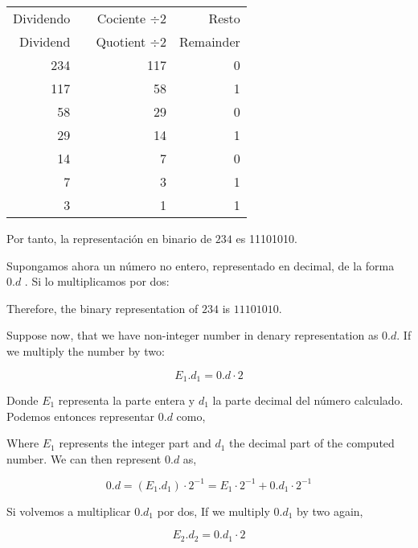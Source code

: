 \begin{table}[h]
	\centering
\begin{tabular}{|r|r|r|r|}
Dividendo& &Cociente $\div 2$&Resto\\
Dividend& &Quotient $\div 2$&Remainder\\
\hline
234& &117&0\\
117& &58&1\\
58& &29&0\\
29& &14&1\\
14& &7&0\\
7& &3&1\\
3& &1&1
\end{tabular}
\end{table}
 \begin{paracol}{2}
 Por tanto, la representación en binario de $234$ es 11101010.
 
Supongamos ahora un número no entero, representado en decimal, de la forma $0.d$ . Si lo multiplicamos por dos:

\switchcolumn

Therefore, the binary representation of $234$ is $11101010$.

 Suppose now, that we have non-integer number in denary representation as $0.d$. If we multiply the number by two:
\end{paracol}


\begin{equation}
E_1.d_1=0.d\cdot 2
\end{equation}
\begin{paracol}{2}
Donde $E_1$ representa la parte entera y $d_1$ la parte decimal del número calculado.
Podemos entonces representar $0.d$ como,

\switchcolumn

Where $E_1$ represents the integer part and $d_1$ the decimal part of the computed number. We can then represent $0.d$ as,
\end{paracol}
\begin{equation}
\label{eq:5}
0.d=(E_1.d_1)\cdot 2^{-1}=E_1\cdot 2^{-1}+0.d_1\cdot 2^{-1}
\end{equation}  
\begin{paracol}{2}
Si volvemos a multiplicar $0.d_1$ por dos,
\switchcolumn
If we multiply $0.d_1$ by two again,
\end{paracol}
\begin{equation}
E_2.d_2 = 0.d_1\cdot 2
\end{equation}

